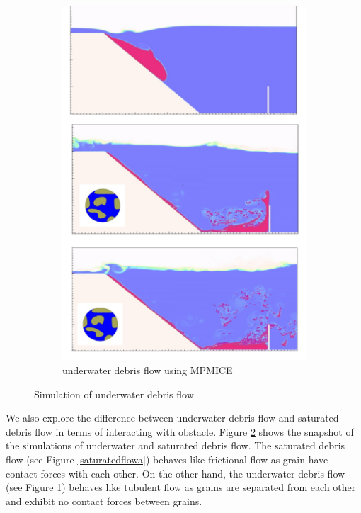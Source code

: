 \documentclass[preprint,12pt]{elsarticle}
\begin{document}
\begin{figure}
\begin{subfigure}[d]{0.5\linewidth}
\includegraphics[width=\linewidth]{MPMICE_debris.jpg}
\caption{underwater debris flow using MPMICE}
\label{saturatedflowb}
\end{subfigure}
\caption{Simulation of underwater debris flow}
\label{saturatedflow}
\end{figure}
%
%
We also explore the difference between underwater debris flow and saturated debris flow in terms of interacting with obstacle. Figure \ref{saturatedflow} shows the snapshot of the simulations of underwater and saturated debris flow. The saturated debris flow (see Figure \ref{saturatedflowa}) behaves like frictional flow as grain have contact forces with each other. On the other hand, the underwater debris flow (see Figure \ref{saturatedflowb}) behaves like tubulent flow as grains are separated from each other and exhibit no contact forces between grains.  \\
\end{document}
